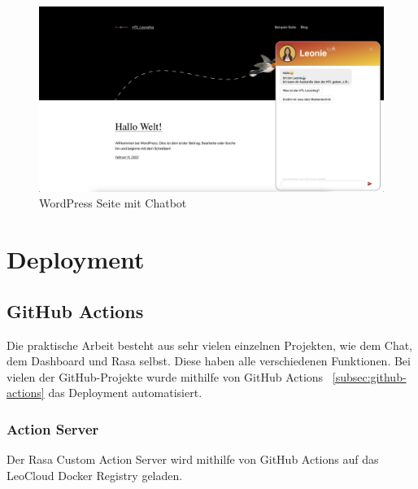 \begin{figure}[hbt!]
    \centering
    \includegraphics[scale=0.25]{pics/wordpresspage}
    \caption{WordPress Seite mit Chatbot}
    \label{fig:impl:wordpresspage}
\end{figure}

\section{Deployment}

\subsection{GitHub Actions}

Die praktische Arbeit besteht aus sehr vielen einzelnen Projekten, wie dem Chat, dem Dashboard und Rasa selbst.
Diese haben alle verschiedenen Funktionen.
Bei vielen der GitHub-Projekte wurde mithilfe von GitHub Actions ~\ref{subsec:github-actions} das Deployment automatisiert.

\subsubsection{Action Server}
Der Rasa Custom Action Server wird mithilfe von GitHub Actions auf das LeoCloud Docker Registry geladen.

